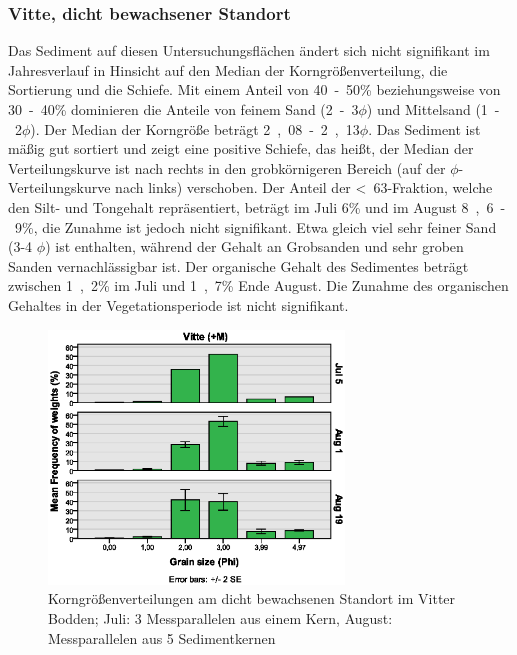 \subsubsection{Vitte, dicht bewachsener Standort}

Das Sediment auf diesen Untersuchungsflächen ändert sich nicht signifikant im Jahresverlauf in Hinsicht auf den Median der Korngrößenverteilung, die Sortierung und die Schiefe. Mit einem Anteil von \unit{40-50}{\%} beziehungsweise von \unit{30-40}{\%} dominieren die Anteile von feinem Sand (\unit{2-3}{$\phi$}) und Mittelsand (\unit{1-2}{$\phi$}). Der Median der Korngröße beträgt \unit{2,08-2,13}{$\phi$}. Das Sediment ist mäßig gut sortiert und zeigt eine positive Schiefe, das heißt, der Median der Verteilungskurve ist nach rechts in den grobkörnigeren Bereich (auf der $\phi$- Verteilungskurve nach links) verschoben. Der Anteil der \unit{< 63}{\mu\metre}-Fraktion, welche den Silt- und Tongehalt repräsentiert, beträgt im Juli \unit{6}{\%} und im August \unit{8,6-9}{\%}, die Zunahme ist jedoch nicht signifikant. Etwa gleich viel sehr feiner Sand (3-4 $\phi$) ist enthalten, während der Gehalt an Grobsanden und sehr groben Sanden vernachlässigbar ist. Der organische Gehalt des Sedimentes beträgt zwischen \unit{1,2}{\%} im Juli und \unit{1,7}{\%} Ende August. Die Zunahme des organischen Gehaltes in der Vegetationsperiode ist nicht signifikant.

\begin{figure}[!htb]
\centering
\includegraphics[width=0.70\textwidth]{images/grainsize/sediment_im_jahr1.eps}
\caption[Korngrößenverteilungen Vitte (+M)]{Korngrößenverteilungen am dicht bewachsenen Standort im Vitter Bodden; Juli: 3 Messparallelen aus einem Kern, August: Messparallelen aus 5 Sedimentkernen}
\label{fig:korngrössen_Vitte_+m}
\end{figure}



